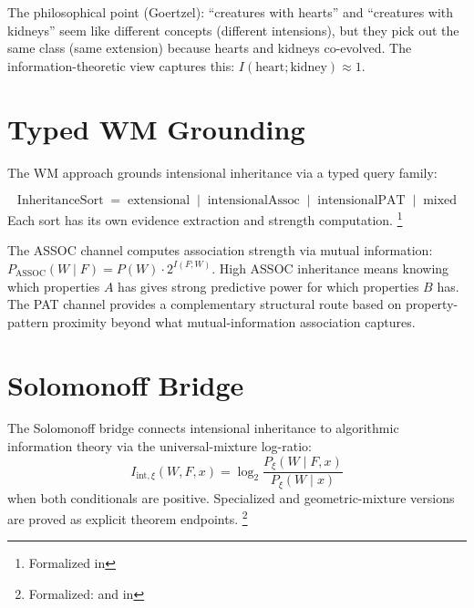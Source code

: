\documentclass[11pt,openany]{report}
\begin{document}
\noindent
The philosophical point (Goertzel): ``creatures with hearts'' and
``creatures with kidneys'' seem like different concepts (different
intensions), but they pick out the same class (same extension)
because hearts and kidneys co-evolved.  The information-theoretic
view captures this: $I(\text{heart}; \text{kidney}) \approx 1$.



\section{Typed WM Grounding}

The WM approach grounds intensional inheritance via a typed query
family:

\begin{definition}
\[
  \mathrm{InheritanceSort} \;=\;
  \mathrm{extensional} \;\mid\;
  \mathrm{intensionalAssoc} \;\mid\;
  \mathrm{intensionalPAT} \;\mid\;
  \mathrm{mixed}
\]
Each sort has its own evidence extraction and strength computation.%
\footnote{Formalized in
}
\end{definition}

\noindent
The ASSOC channel computes association strength via mutual
information: $P_{\mathrm{ASSOC}}(W \mid F) = P(W) \cdot 2^{I(F; W)}$.
High ASSOC inheritance means knowing which properties $A$ has gives
strong predictive power for which properties $B$ has.  The PAT
channel provides a complementary structural route based on
property-pattern proximity beyond what mutual-information association
captures.


\section{Solomonoff Bridge}

The Solomonoff bridge connects intensional inheritance to algorithmic
information theory via the universal-mixture log-ratio:
\[
  I_{\mathrm{int},\xi}(W, F, x) =
  \log_2 \frac{P_\xi(W \mid F, x)}{P_\xi(W \mid x)}
\]
when both conditionals are positive.  Specialized
 and geometric-mixture versions are proved as
explicit theorem endpoints.%
\footnote{Formalized:
 and
 in
}
\end{document}
